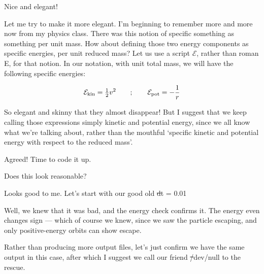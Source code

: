 \carol
Nice and elegant!

\bob
Let me try to make it more elegant.  I'm beginning to remember more
and more now from my physics class.  There was this notion of specific
something as something per unit mass.  How about defining those two
energy components as specific energies, per unit reduced mass?  Let us
use a script $\mathcal{E}$, rather than roman E, for that notion.  In
our notation, with unit total mass, we will have the following
specific energies:

\cba

\begin{equation}
\mathcal{E}_{\rm kin} = {\textstyle\frac{1}{2}} v^2
\qquad
;
\qquad
\mathcal{E}_{\rm pot} = - \frac{1}{r}
\end{equation}

\abc

\carol
So elegant and skinny that they almost disappear!  But I suggest that
we keep calling those expressions simply kinetic and potential energy,
since we all know what we're talking about, rather than the mouthful
`specific kinetic and potential energy with respect to the reduced mass'.

\alice
Agreed!  Time to code it up.

\carol
Does this look reasonable?

\cba


\abc

\bob
Looks good to me.  Let's start with our good old {\st dt = 0.01}

\cba

\abc

\bob
Well, we knew that it was bad, and the energy check confirms it.
The energy even changes sign --- which of course we knew, since we saw
the particle escaping, and only positive-energy orbits can show escape.

\carol
Rather than producing more output files, let's just confirm we have
the same output in this case, after which I suggest we call our friend
{\st /dev/null} to the rescue.

